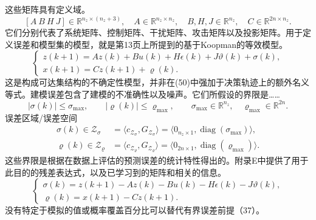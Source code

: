 \documentclass{article}
\begin{document}
这些矩阵具有定义域。
\[
[A\ B\ H\ J]\in\mathbb{R}^{n_z\times(n_z+3)},\quad
A\in\mathbb{R}^{n_z\times n_z},\quad B,H,J\in\mathbb{R}^{n_z},\quad C\in\mathbb{R}^{2n\times n_z}.
\]
它们分别代表了系统矩阵、控制矩阵、干扰矩阵、攻击矩阵以及投影矩阵。用于定义误差和模型集的模型，就是第13页上所提到的基于Koopman的等效模型。
\begin{equation}
\begin{cases}
z(k+1)=Az(k)+Bu(k)+H\epsilon(k)+J\vartheta(k)+\sigma(k),\\
x(k+1)=Cz(k+1)+\varrho(k).
\end{cases} \tag{36}
\end{equation}
这是构成可达集结构的不确定性模型，并非在(50)中强加于决策轨迹上的额外名义等式。建模误差包含了建模的不准确性以及噪声。它们所假设的界限是……
\begin{equation}
|\sigma(k)|\leq\sigma_{\max},\qquad |\varrho(k)|\leq\varrho_{\max},\qquad
\sigma_{\max}\in\mathbb{R}^{n_z},\quad\varrho_{\max}\in\mathbb{R}^{2n}. \tag{37}
\end{equation}
误差区域/误差空间
\begin{equation}
\begin{aligned}
\sigma(k)\in\mathcal{Z}_{\sigma}
&=\langle c_{\mathcal{Z}_{\sigma}},G_{\mathcal{Z}_{\sigma}}\rangle
=\langle0_{n_z\times1},\operatorname{diag}(\sigma_{\max})\rangle,\\
\varrho(k)\in\mathcal{Z}_{\varrho}
&=\langle c_{\mathcal{Z}_{\varrho}},G_{\mathcal{Z}_{\varrho}}\rangle
=\langle0_{2n\times1},\operatorname{diag}(\varrho_{\max})\rangle.
\end{aligned} \tag{38}
\end{equation}
这些界限是根据在数据上评估的预测误差的统计特性得出的。附录E中提供了用于此目的的残差表达式，以及已学习到的矩阵和相关的信息。
\begin{equation}
\begin{cases}
\sigma(k)=z(k+1)-Az(k)-Bu(k)-H\epsilon(k)-J\vartheta(k),\\
\varrho(k)=x(k+1)-Cz(k+1).
\end{cases} \tag{E.1}
\end{equation}
没有特定于模拟的值或概率覆盖百分比可以替代有界误差前提（37）。
\end{document}
